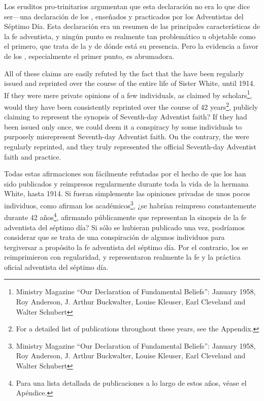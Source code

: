 Los eruditos pro-trinitarios argumentan que esta declaración no era lo que dice ser—una declaración de los , enseñados y practicados por los Adventistas del Séptimo Día. Esta declaración era un resumen de las principales características de la fe adventista, y ningún punto es realmente tan problemático u objetable como el primero, que trata de la  y de dónde está su presencia. Pero la evidencia a favor de los , especialmente el primer punto, es abrumadora.


All of these claims are easily refuted by the fact that the  have been regularly issued and reprinted over the course of the entire life of Sister White, until 1914. If they were mere private opinions of a few individuals, as claimed by scholars\footnote{Ministry Magazine “Our Declaration of Fundamental Beliefs”: January 1958, Roy Anderson, J. Arthur Buckwalter, Louise Kleuser, Earl Cleveland and Walter Schubert}, would they have been consistently reprinted over the course of 42 years\footnote{For a detailed list of publications throughout these years, see the Appendix.}, publicly claiming to represent the synopsis of Seventh-day Adventist faith? If they had been issued only once, we could deem it a conspiracy by some individuals to purposely misrepresent Seventh-day Adventist faith. On the contrary, the  were regularly reprinted, and they truly represented the official Seventh-day Adventist faith and practice.


Todas estas afirmaciones son fácilmente refutadas por el hecho de que los  han sido publicados y reimpresos regularmente durante toda la vida de la hermana White, hasta 1914. Si fueran simplemente las opiniones privadas de unos pocos individuos, como afirman los académicos\footnote{Ministry Magazine “Our Declaration of Fundamental Beliefs”: January 1958, Roy Anderson, J. Arthur Buckwalter, Louise Kleuser, Earl Cleveland and Walter Schubert}, ¿se habrían reimpreso constantemente durante 42 años\footnote{Para una lista detallada de publicaciones a lo largo de estos años, véase el Apéndice.}, afirmando públicamente que representan la sinopsis de la fe adventista del séptimo día? Si sólo se hubieran publicado una vez, podríamos considerar que se trata de una conspiración de algunos individuos para tergiversar a propósito la fe adventista del séptimo día. Por el contrario, los  se reimprimieron con regularidad, y representaron realmente la fe y la práctica oficial adventista del séptimo día.


